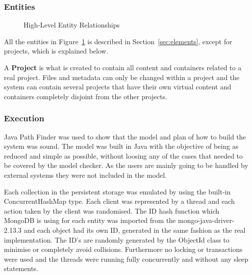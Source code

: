 \documentclass[a4paper,12pt]{article}
\begin{document}
\subsubsection{Entities}
\begin{figure}[H] 
    \caption{High-Level Entity Relationships}
    \label{fig:relation}
\end{figure}

All the entities in Figure~\ref{fig:relation} is described in Section~\ref{sec:elements}, except for
projects, which is explained below. \\
\vspace{0.5em}

A \textbf{Project} is what is created to contain all content and containers related to a real project. Files
and metadata can only be changed within a project and the system can contain several projects 
that have their own virtual content and containers completely disjoint from the other projects.\\

\subsubsection{Execution}
Java Path Finder was used to show that the model and plan of how to build the system was sound. The
model was built in Java with the objective of being as reduced and simple as possible, without
loosing any of the cases that needed to be covered by the model checker. As the users are mainly
going to be handled by external systems they were not included in the model.

Each collection in the persistent storage was emulated by using the built-in ConcurrentHashMap type.
Each client was represented by a thread and each action taken by the client was randomised. The ID
hash function which MongoDB is using for each entity was imported from the mongo-java-driver-2.13.3
and each object had its own ID, generated in the same fashion as the real implementation. The ID's
are randomly generated by the ObjectId class to minimise or completely avoid collisions.
Furthermore no locking or transactions were used and the threads were running fully concurrently and
without any sleep statements. 
\end{document}
